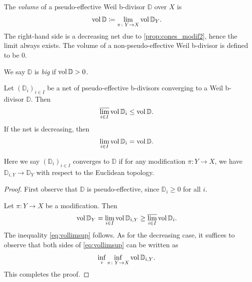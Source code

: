 \begin{definition}\label{def:volb}
    The \emph{volume} of a pseudo-effective Weil b-divisor $\mathbb{D}$ over $X$ is
    \[
        \operatorname{vol} \mathbb{D}\coloneqq \lim_{\pi\colon Y\rightarrow X} \operatorname{vol} \mathbb{D}_Y.
    \]
    The right-hand side is a decreasing net due to \cref{prop:cones_modif2}, hence the limit always exists. The volume of a non-pseudo-effective Weil b-divisor is defined to be $0$.

    We say $\mathbb{D}$ is \emph{big} if $\operatorname{vol} \mathbb{D}>0$.
\end{definition}

\begin{lemma}\label{lma:volbdivnet}
    Let $(\mathbb{D}_i)_{i\in I}$ be a net of pseudo-effective b-divisors converging to a Weil b-divisor $\mathbb{D}$. Then
    \begin{equation}\label{eq:vollimsup}
    \varlimsup_{i\in I}\operatorname{vol} \mathbb{D}_i\leq \operatorname{vol} \mathbb{D}.
    \end{equation}
    If the net is decreasing, then
    \[
    \lim_{i\in I}\operatorname{vol} \mathbb{D}_i=\operatorname{vol} \mathbb{D}.
    \]
\end{lemma}
Here we say $(\mathbb{D}_i)_{i\in I}$ converges to $\mathbb{D}$ if for any modification $\pi\colon Y\rightarrow X$, we have $\mathbb{D}_{i,Y}\to \mathbb{D}_Y$ with respect to the Euclidean topology.
\begin{proof}
    First observe that $\mathbb{D}$ is pseudo-effective, since $\mathbb{D}_i\geq 0$ for all $i$.

    Let $\pi\colon Y\rightarrow X$ be a modification. Then
    \[
    \operatorname{vol} \mathbb{D}_Y=\lim_{i\in I} \operatorname{vol} \mathbb{D}_{i,Y}\geq \varlimsup_{i\in I} \operatorname{vol} \mathbb{D}_i.
    \]
    The inequality \eqref{eq:vollimsup} follows.
    As for the decreasing case, it suffices to observe that both sides of \eqref{eq:vollimsup} can be written as
    \[
    \inf_i \inf_{\pi\colon Y\rightarrow X} \operatorname{vol} \mathbb{D}_{i,Y}.
    \]
    This completes the proof.
\end{proof}

